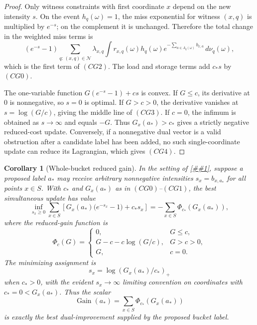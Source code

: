 \documentclass[10pt]{article}
\newcommand{\cref}[1]{\ref{##1}}
\newtheorem{corollary}[theorem]{Corollary}
\theoremstyle{definition}
\begin{document}
\begin{proof}
   Only witness constraints with first coordinate \(x\) depend on the new
   intensity \(s\).  On the event \(h_q(\omega)=1\), the miss exponential for
   witness \((x,q)\) is multiplied by \(e^{-s}\); on the complement it is
   unchanged.  Therefore the total change in the weighted miss terms is
   \[
      (e^{-s}-1)
      \sum_{q:\,(x,q)\in\mathcal N}
      \lambda_{x,q}
      \int r_{x,q}(\omega)h_q(\omega)
      e^{-\sum_{a\in A_q(\omega)}b_{x,a}}\,d\nu_q(\omega),
   \]
   which is the first term of \((CG2)\).  The load and storage terms add
   \(c_*s\) by \((CG0)\).

   The one-variable function
   \(G(e^{-s}-1)+cs\) is convex.  If \(G\le c\), its derivative at \(0\) is
   nonnegative, so \(s=0\) is optimal.  If \(G>c>0\), the derivative vanishes at
   \(s=\log(G/c)\), giving the middle line of \((CG3)\).  If \(c=0\), the
   infimum is obtained as \(s\to\infty\) and equals \(-G\).  Thus
   \(G_x(a_*)>c_*\) gives a strictly negative reduced-cost update.  Conversely,
   if a nonnegative dual vector is a valid obstruction after a candidate label
   has been added, no such single-coordinate update can reduce its Lagrangian,
   which gives \((CG4)\).
\end{proof}

\begin{corollary}[Whole-bucket reduced gain]
   \label{cor:whole-bucket-reduced-gain}
   In the setting of \cref{lem:rate-coverage-column-gain}, suppose a proposed
   label \(a_*\) may receive arbitrary nonnegative intensities
   \(s_x=b_{x,a_*}\) for all points \(x\in S\).  With \(c_*\) and \(G_x(a_*)\)
   as in \((CG0)\)--\((CG1)\), the best simultaneous update has value
   \[
      \inf_{s_x\ge0}
      \sum_{x\in S}
      \left[
         G_x(a_*)\bigl(e^{-s_x}-1\bigr)+c_*s_x
      \right]
      =
      -\sum_{x\in S}\Phi_{c_*}(G_x(a_*)),
      \tag{BG1}
   \]
   where the reduced-gain function is
   \[
      \Phi_c(G)=
      \begin{cases}
      0, & G\le c,\\[1mm]
      G-c-c\log(G/c), & G>c>0,\\[1mm]
      G, & c=0.
      \end{cases}
      \tag{BG2}
   \]
   The minimizing assignment is
   \[
      s_x=\log(G_x(a_*)/c_*)_+
      \tag{BG3}
   \]
   when \(c_*>0\), with the evident \(s_x\to\infty\) limiting convention on
   coordinates with \(c_*=0<G_x(a_*)\).  Thus the scalar
   \[
      \operatorname{Gain}(a_*)=
      \sum_{x\in S}\Phi_{c_*}(G_x(a_*))
      \tag{BG4}
   \]
   is exactly the best dual-improvement supplied by the proposed bucket label.
\end{corollary}
\end{document}

